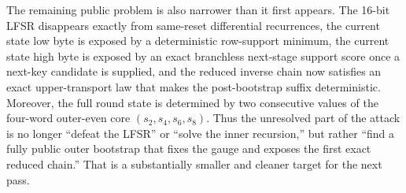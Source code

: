 \documentclass[11pt]{article}
\begin{document}
The remaining public problem is also narrower than it first appears. The 16-bit LFSR disappears exactly from same-reset differential recurrences, the current state low byte is exposed by a deterministic row-support minimum, the current state high byte is exposed by an exact branchless next-stage support score once a next-key candidate is supplied, and the reduced inverse chain now satisfies an exact upper-transport law that makes the post-bootstrap suffix deterministic. Moreover, the full round state is determined by two consecutive values of the four-word outer-even core $(s_2,s_4,s_6,s_8)$. Thus the unresolved part of the attack is no longer ``defeat the LFSR'' or ``solve the inner recursion,'' but rather ``find a fully public outer bootstrap that fixes the gauge and exposes the first exact reduced chain.'' That is a substantially smaller and cleaner target for the next pass.
\end{document}
